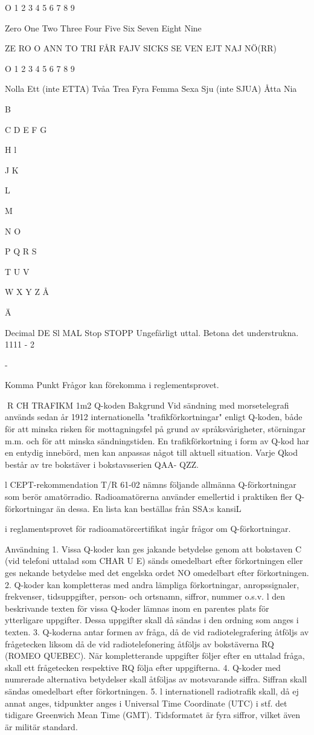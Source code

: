 \documentclass[a4paper,twoside,twocolumn,openright]{book}
\begin{document}
{{{{{O
1
2
3
4
5
6
7
8
9

Zero
One
Two
Three
Four
Five
Six
Seven
Eight
Nine

ZE RO
O ANN
TO
TRI
FÅR
FAJV
SICKS
SE VEN
EJT
NAJ NÖ(RR)

O
1
2
3
4
5
6
7
8
9

Nolla
Ett (inte ETTA)
Tvåa
Trea
Fyra
Femma
Sexa
Sju (inte SJUA)
Åtta
Nia

B

C
D
E
F
G

H
l

J
K

L

M

N
O

P
Q
R
S

T
U
V

W
X
Y
Z
Å

Ä

Decimal
DE Sl MAL
Stop
STOPP
Ungefärligt uttal. Betona det understrukna.
1111 - 2

-

Komma
Punkt
Frågor kan förekomma i reglementsprovet.

R CH TRAFIKM
1m2 Q-koden
Bakgrund
Vid sändning med morsetelegrafi används
sedan år 1912 internationella "trafikförkortningar" enligt Q-koden, både för att minska
risken för mottagningsfel på grund av språksvårigheter, störningar m.m. och för att minska sändningstiden. En trafikförkortning i form
av Q-kod har en entydig innebörd, men kan
anpassas något till aktuell situation. Varje Qkod består av tre bokstäver i bokstavsserien
QAA- QZZ.

l CEPT-rekommendation T/R 61-02
nämns följande allmänna Q-förkortningar
som berör amatörradio.
Radioamatörerna använder emellertid i praktiken fler Q-förkortningar än
dessa. En lista kan beställas från SSA:s
kansiL

i reglamentsprovet för radioamatörcertifikat ingår frågor om Q-förkortningar.

Användning
1. Vissa Q-koder kan ges jakande betydelse
genom att bokstaven C (vid telefoni uttalad som CHAR U E) sänds omedelbart
efter förkortningen eller ges nekande betydelse med det engelska ordet NO omedelbart efter förkortningen.
2. Q-koder kan kompletteras med andra
lämpliga förkortningar, anropssignaler,
frekvenser, tidsuppgifter, person- och
ortsnamn, siffror, nummer o.s.v. l den beskrivande texten för vissa Q-koder lämnas inom en parentes plats för ytterligare
uppgifter. Dessa uppgifter skall då sändas i den ordning som anges i texten.
3. Q-koderna antar formen av fråga, då de
vid radiotelegrafering åtföljs av frågetecken liksom då de vid radiotelefonering
åtföljs av bokstäverna RQ (ROMEO
QUEBEC). När kompletterande uppgifter följer efter en uttalad fråga, skall ett
frågetecken respektive RQ följa efter
uppgifterna.
4. Q-koder med numrerade alternativa betydelser skall åtföljas av motsvarande
siffra. Siffran skall sändas omedelbart
efter förkortningen.
5. l internationell radiotrafik skall, då ej annat anges, tidpunkter anges i Universal
Time Coordinate (UTC) i stf. det tidigare
Greenwich Mean Time (GMT). Tidsformatet är fyra siffror, vilket även är militär
standard.

}}}}}
\end{document}
